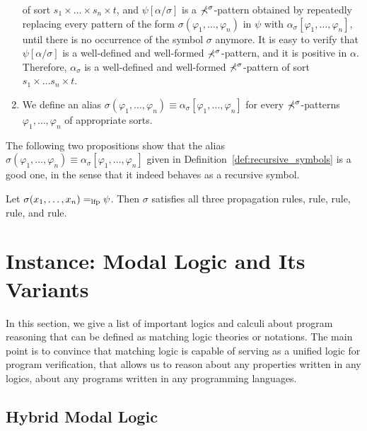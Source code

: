 \documentclass{amsart}
\begin{document}
\begin{definition}
\begin{enumerate}
      of sort $s_1 \times \dots \times s_n \times t$,
      and $\psi[\alpha / \sigma]$ is a $\mathbb{\Sigma}^\sigma$-pattern
      obtained by repeatedly replacing every pattern of the form
      $\sigma(\varphi_1,\dots,\varphi_n)$ in $\psi$
      with $\alpha_\sigma[\varphi_1,\dots,\varphi_n]$,
      until there is no occurrence of the symbol $\sigma$ anymore.
      It is easy to verify that $\psi[\alpha / \sigma]$ is
      a well-defined and well-formed $\mathbb{\Sigma}^\sigma$-pattern,
      and it is positive in $\alpha$.
      Therefore, $\alpha_\sigma$ is a well-defined and well-formed
      $\mathbb{\Sigma}^\sigma$-pattern of sort $s_1 \times \dots s_n \times t$.
\item We define an alias 
      $\sigma(\varphi_1,\dots,\varphi_n) \equiv 
      \alpha_\sigma[\varphi_1,\dots,\varphi_n]$
      for every $\mathbb{\Sigma}^\sigma$-patterns $\varphi_1,\dots,\varphi_n$
      of appropriate sorts.
\end{enumerate}
\end{definition}

The following two propositions show that
the alias
$\sigma(\varphi_1,\dots,\varphi_n) 
 \equiv \alpha_\sigma[\varphi_1,\dots,\varphi_n]$
given in Definition~\ref{def:recursive_symbols}
is a good one,
in the sense that it indeed behaves as a recursive symbol.

\begin{proposition}
Let $\sigma(x_1,\dots,x_n) =_{\mathrm{lfp}} \psi$.
Then $\sigma$ satisfies all three propagation rules,
 rule,  rule,
 rule, and  rule.
\end{proposition}

\section{Instance: Modal Logic and Its Variants}

In this section, we give a list of important logics and calculi about
program reasoning that can be defined as matching logic theories or notations.
The main point is to convince that matching logic is capable of
serving as a unified logic for program verification,
that allows us to reason about any properties written in any logics,
about any programs written in any programming languages.

\subsection{Hybrid Modal Logic}
\label{sec_hybrid_modal_logic}
\end{document}
